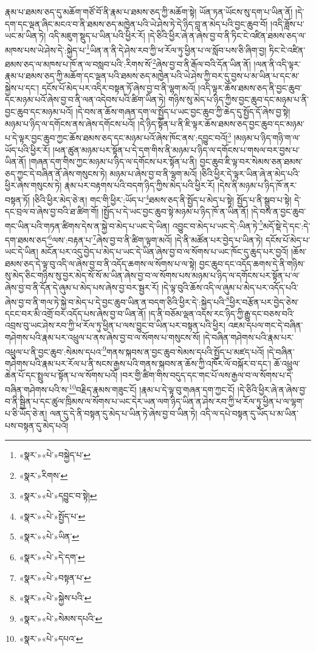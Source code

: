 རྣམ་པ་ཐམས་ཅད་དུ་མཆོག་གཙོ་བོ་ནི་རྣམ་པ་ཐམས་ཅད་ཀྱི་མཆོག་སྟེ། ཡོན་ཏན་ཡོངས་སུ་དག་པ་ཡིན་ནོ། །དེ་དག་དང་ལྡན་ཞིང་མངའ་བ་ནི་ཐམས་ཅད་མཁྱེན་པའི་ཡེ་ཤེས་ཏེ་དེ་ཉིད་བླ་ན་མེད་པའི་བྱང་ཆུབ་བོ། །འདི་ཟློས་པ་ཡང་མ་ཡིན་ཏེ། འདི་མཇུག་སྡུད་པ་ཡིན་པའི་ཕྱིར་རོ། །དེ་ཅིའི་ཕྱིར་ཞེ་ན་ཞེས་བྱ་བ་ནི་ཏིང་ངེ་འཛིན་ཐམས་ཅད་ལ་མཁས་པས་ཡེ་ཤེས་དེ་:སྐྱེད་པ་\footnote{«སྣར་»«པེ་»བསྐྱེད་པ་}ཡིན་ན་ནི་དེ་ཤེས་རབ་ཀྱི་ཕ་རོལ་ཏུ་ཕྱིན་པ་ལ་སློབ་པས་ཅི་ཞིག་བྱ། ཏིང་ངེ་འཛིན་ཐམས་ཅད་ལ་མཁས་པ་ཁོ་ན་ལ་བསླབ་པའི་:རིགས་སོ་\footnote{«སྣར་»རིགས་}ཞེས་བྱ་བ་ནི་རྒོལ་བའི་དོན་ཡིན་ནོ། །ལན་ནི་འདི་ལྟར་རྣམ་པ་ཐམས་ཅད་ཀྱི་མཆོག་དང་ལྡན་པའི་ཐམས་ཅད་མཁྱེན་པའི་ཡེ་ཤེས་ཀྱི་བར་དུ་བྱས་པ་མ་ཡིན་པ་དང་མ་སྐྱེས་པ་དང་། དངོས་པོ་མེད་པར་འདིར་བསྟན་ཏོ་ཞེས་བྱ་བ་ནི་ལྷག་མའོ། །འདི་ལྟར་ཆོས་ཐམས་ཅད་ནི་བྱང་ཆུབ་དང་མཉམ་པའོ་ཞེས་བྱ་བ་ནི་ལན་འདེབས་པའི་ཚིག་ཡིན་ཏེ། གཉིས་སུ་མེད་པ་ཉིད་ཀྱིས་བྱང་ཆུབ་དང་མཉམ་པ་ནི་བྱང་ཆུབ་དང་མཉམ་པའོ། །དེ་བས་ན་ཆོས་གཞན་དག་ལ་སྤྱོད་པ་ཡང་བྱང་ཆུབ་ཀྱི་ཆེད་དུ་སྤྱོད་དོ་ཞེས་བྱ་སྟེ། མཉམ་པ་ཉིད་ལ་དགོངས་ནས་ཞེས་དགོངས་པའོ། །དེ་ཉིད་སྟོན་པ་ནི་ཇི་ལྟར་ཆོས་ཐམས་ཅད་བྱང་ཆུབ་དང་མཉམ་པ་དེ་ལྟར་བྱང་ཆུབ་ཀྱང་ཆོས་ཐམས་ཅད་དང་མཉམ་པའོ་ཞེས་ཁོང་ནས་:དབྱུང་བའོ།\footnote{«སྣར་»«པེ་»དབྱུང་བ་སྟེ།} །མཉམ་པ་ཉིད་གཉི་ག་ལ་ཡོད་པའི་ཕྱིར་རོ། །ཕན་ཚུན་མཉམ་པར་སྟོན་པ་དེ་དག་གིས་ནི་མཉམ་པ་ཉིད་ལ་དགོངས་པ་གསལ་བར་བྱས་པ་ཡིན་ནོ། །གཞན་དག་གིས་ཀྱང་མཉམ་པ་ཉིད་ལ་དགོངས་པར་སྟོན་པ་ནི། བྱང་ཆུབ་ཇི་ལྟ་བར་སེམས་ཅན་ཐམས་ཅད་ཀྱང་དེ་བཞིན་ནོ་ཞེས་གསུངས་ཏེ། མཉམ་པ་ཞེས་བྱ་བ་ནི་ལྷག་མའོ། །ཅིའི་ཕྱིར་དེ་ལྟར་ཡིན་ཞེ་ན་མེད་པའི་ཕྱིར་ཞེས་གསུངས་ཏེ། རྣམ་པར་བརྟགས་པའི་བདག་ཉིད་ཀྱིས་མེད་པའི་ཕྱིར་རོ། །དེས་ནི་མཉམ་པ་ཉིད་ཁོ་ནར་བསྟན་ཏོ། །ཅིའི་ཕྱིར་མེད་ཅེ་ན། གང་གི་ཕྱིར་:ཡོད་པ་\footnote{«སྣར་»«པེ་»སྤྱོད་པ་}ཐམས་ཅད་ནི་སྤྱོད་པ་མེད་པ་སྟེ། སྤྱོད་པ་ནི་སྒྲུབ་པ་སྟེ། དེ་དང་བྲལ་བ་ཞེས་བྱ་བའི་ཐ་ཚིག་གོ། །སྤྱོད་པ་དེ་ཡང་བྱང་ཆུབ་སྟེ་མཉམ་པ་ཉིད་ཁོ་ན་ཡིན་ནོ། །དེ་བས་ན་བྱང་ཆུབ་གང་ཡིན་པའི་གཏན་ཚིགས་དེས་ན་སྐྱེ་བ་མེད་པ་ཡང་དེ་ཡིན། འབྱུང་བ་མེད་པ་ཡང་དེ་:ཡིན་ཏེ་\footnote{«སྣར་»«པེ་»ཡིན་}མདོ་སྡེ་དེ་དང་:དེ་དག་ཐམས་ཅད་\footnote{«སྣར་»«པེ་»དེ་དག་}ལས་:བརྟན་པ་\footnote{«སྣར་»«པེ་»བསྟན་པ་}ཞེས་བྱ་བ་ནི་ཚིག་ལྟག་མའོ། །དེ་ནི་མཚོན་པར་བྱེད་པ་ཡིན་ཏེ། དངོས་པོ་མེད་པ་ཡང་དེ་ཡིན། མངོན་པར་འདུ་བྱེད་པ་མེད་པ་ཡང་དེ་ཡིན་ཞེས་བྱ་བ་ལ་སོགས་པ་ཡང་ཁོང་དུ་ཆུད་པར་བྱའོ། །ཆོས་ཐམས་ཅད་དེ་ལྟ་བུ་འདི་ལ་ཞེས་བྱ་བ་ནི་འདོད་ཆགས་ལ་སོགས་པ་ལ་སྟེ། བྱང་ཆུབ་དང་འདོད་ཆགས་དེ་ནི་གཉིས་སུ་མེད་ཅིང་གཉིས་སུ་བྱར་མེད་སོ་སོ་མ་ཡིན་ཞེས་བྱ་བ་ལ་སོགས་པས་མཉམ་པ་ཉིད་ལ་དགོངས་པར་སྟོན་པ་ལ་ཞེས་བྱ་བ་ནི་དོན་དེ་ཞུམ་པ་མེད་པས་ཞེས་བྱ་བར་སྦྱར་རོ། །དེ་ལྟ་བུའི་ཆོས་འདི་ལ་ཞུམ་པ་མེད་པར་འདོད་པའི་ཞེས་བྱ་བ་ནི་གལ་ཏེ་སྐྱེ་བ་མེད་པ་དེ་བྱང་ཆུབ་ཡིན་ན་བདག་ཅིའི་ཕྱིར་དེ་:སྐྱེད་པའི་\footnote{«སྣར་»«པེ་»སྐྱེས་པའི་}ཕྱིར་བརྩོན་པར་བྱེད་ཅེས་དངང་བར་མི་འགྲོ་བར་འདོད་པས་ཞེས་བྱ་བ་ཡིན་ནོ། །ད་ནི་བཅོམ་ལྡན་འདས་རང་ཉིད་ཀྱི་རྒྱུ་དང་བཅས་བའི་འབྲས་བུ་ཡང་ཤེས་རབ་ཀྱི་ཕ་རོལ་ཏུ་ཕྱིན་པ་ལས་བྱུང་བ་ཡིན་པར་བསྟན་པའི་ཕྱིར། འཇམ་དཔལ་གང་དེ་བཞིན་གཤེགས་པའི་རྣམ་པར་འཕྲུལ་པ་ནས་ཞེས་བྱ་བ་ལ་སོགས་པ་གསུངས་སོ། །དེ་བཞིན་གཤེགས་པའི་རྣམ་པར་འཕྲུལ་པ་ནི་བྱང་ཆུབ་:སེམས་དཔའ་\footnote{«སྣར་»«པེ་»སེམས་དཔའི་}གནས་སྐབས་ན་བྱང་ཆུབ་སེམས་དཔའི་སྤྱོད་པ་མཛད་པའོ། །དེ་བཞིན་གཤེགས་པའི་རྣམ་པར་རོལ་པ་ནི་སངས་རྒྱས་པའི་གནས་སྐབས་ན་ཆོས་ཀྱི་འཁོར་ལོ་བསྐོར་བ་དང་། ཆོ་འཕྲུལ་ཆེན་པོ་དང་སྤྲུལ་པ་སྟོན་པ་ལ་སོགས་པའོ། །བར་གྱི་ཚིག་གིས་བདུད་དང་གང་པོ་ལས་རྒྱལ་བ་ལ་སོགས་པ་དེ་བཞིན་གཤེགས་པའི་ས་\footnote{«སྣར་»«པེ་»དཔའ་}བརྗིད་རྣམས་གཟུང་ངོ། །རྣམ་པ་དེ་ལྟ་བུ་གཞན་དག་ཀྱང་ངོ། །དེ་ཅིའི་ཕྱིར་ཞེ་ན་ཞེས་བྱ་བ་ནི་སྦྱིན་པ་དང་ཚུལ་ཁྲིམས་ལ་སོགས་པ་ཡང་དེར་ཡན་ལག་ཉིད་ཡིན་ན་ཤེས་རབ་ཀྱི་ཕ་རོལ་ཏུ་ཕྱིན་པ་ལ་ལྷག་པ་ཅི་ཡོད་ཅེ་ན། ལན་དུ་དེ་ནི་བསྟན་དུ་མེད་པ་ཡིན་ཏེ་ཞེས་བྱ་བ་ཡིན་ཏེ། འདི་ལ་དཔེ་བསྟན་དུ་ཡོད་པ་མ་ཡིན་པས་བསྟན་དུ་མེད་པའོ། 